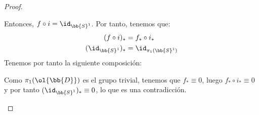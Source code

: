 \begin{prop}
\begin{proof}
\begin{description}
            Entonces, $f\circ i=\id_{\bb{S}^1}$. Por tanto, tenemos que:
            \begin{align*}
                (f\circ i)_* &= f_* \circ i_*\\
                (\id_{\bb{S}^1})_* &= \id_{\pi_1(\bb{S}^1)}
            \end{align*}
            Tenemos por tanto la siguiente composición:
            \begin{center}
            \end{center}

            Como $\pi_1(\ol{\bb{D}})$ es el grupo trivial, tenemos que $f_*\equiv 0$, luego $f_*\circ i_* \equiv 0$ y por tanto $(\id_{\bb{S}^1})_* \equiv 0$, lo que es una contradicción.
        \end{description}
    \end{proof}
\end{prop}

